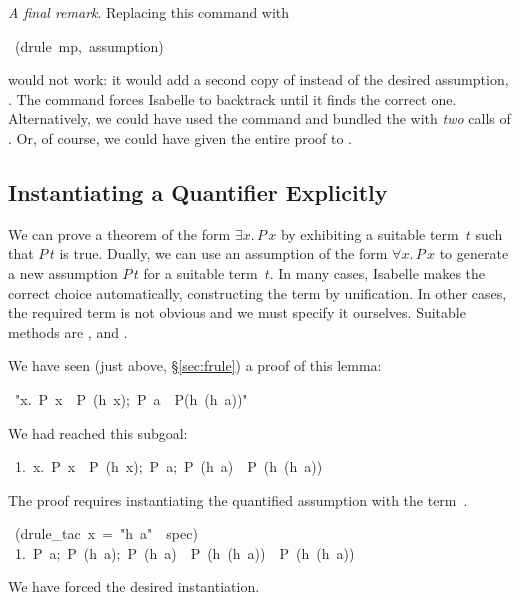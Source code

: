 \medskip
\emph{A final remark}.  Replacing this  command with
\begin{isabelle}
\ (drule\ mp,\ assumption)
\end{isabelle}
would not work: it would add a second copy of  instead
of the desired assumption, .  The 
command forces Isabelle to backtrack until it finds the correct one.
Alternatively, we could have used the  command and bundled the
 with \emph{two} calls of .  Or, of course,
we could have given the entire proof to .%



\subsection{Instantiating a Quantifier Explicitly}

We can prove a theorem of the form $\exists x.\,P\, x$ by exhibiting a
suitable term~$t$ such that $P\,t$ is true.  Dually, we can use an
assumption of the form $\forall x.\,P\, x$ to generate a new assumption $P\,t$ for
a suitable term~$t$.  In many cases, 
Isabelle makes the correct choice automatically, constructing the term by
unification.  In other cases, the required term is not obvious and we must
specify it ourselves.  Suitable methods are , 
and .

We have seen (just above, {\S}\ref{sec:frule}) a proof of this lemma:
\begin{isabelle}
\ "\isasymlbrakk \isasymforall x.\ P\ x\
\isasymlongrightarrow \ P\ (h\ x);\ P\ a\isasymrbrakk \
\isasymLongrightarrow \ P(h\ (h\ a))"
\end{isabelle}
We had reached this subgoal:
\begin{isabelle}
\ 1.\ \isasymlbrakk{\isasymforall}x.\ P\ x\ \isasymlongrightarrow\ P\ (h\
x);\ P\ a;\ P\ (h\ a)\isasymrbrakk\ \isasymLongrightarrow\ P\ (h\ (h\ a))
\end{isabelle}
%
The proof requires instantiating the quantified assumption with the
term~\isa{h~a}.
\begin{isabelle}
\isacommand{apply}\ (drule_tac\ x\ =\ "h\ a"\ \isakeyword{in}\
spec)\isanewline
\ 1.\ \isasymlbrakk P\ a;\ P\ (h\ a);\ P\ (h\ a)\ \isasymlongrightarrow \
P\ (h\ (h\ a))\isasymrbrakk \ \isasymLongrightarrow \ P\ (h\ (h\ a))
\end{isabelle}
We have forced the desired instantiation.


